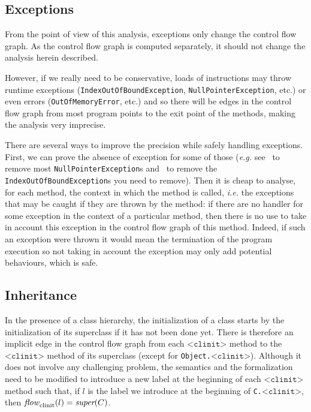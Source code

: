 \documentclass{entcs}
\newcommand{\clinit}{\ensuremath{\texttt{<clinit>}}}
\newcommand{\flow}{\mathit{flow}}
\newcommand{\clinitflow}{\flow_{\rm clinit}}
\begin{document}
\subsection{Exceptions}
\label{sec:exceptions}


From the point of view of this analysis, exceptions only change the
control flow graph.  As the control flow graph is computed separately,
it should not change the analysis herein described.

However, if we really need to be conservative, loads of instructions
may throw runtime exceptions (\texttt{IndexOutOfBoundException},
\texttt{NullPointerException}, etc.) or even errors
(\texttt{OutOfMemoryError}, etc.) and so there will be edges in the
control flow graph from most program points to the exit point of the
methods, making the analysis very imprecise.

There are several ways to improve the precision while safely handling
exceptions.  First, we can prove the absence of exception for some of
those (\emph{e.g.} see~\cite{hubert08-2:nonnull_annotation_inferencer}
to remove most \texttt{NullPointerException}s and~\cite{bodik00abcd}
to remove the \texttt{IndexOutOfBoundException}s you need to remove).
Then it is cheap to analyse, for each method, the context in which the
method is called, \emph{i.e.} the exceptions that may be caught if
they are thrown by the method: if there are no handler for some
exception in the context of a particular method, then there is no use
to take in account this exception in the control flow graph of this
method.  Indeed, if such an exception were thrown it would mean the
termination of the program execution so not taking in account the
exception may only add potential behaviours, which is safe.

\subsection{Inheritance}
\label{sec:class-hierarchy}
In the presence of a class hierarchy, the initialization of a class
starts by the initialization of its superclass if it has not been done
yet.  There is therefore an implicit edge in the control flow graph
from each \clinit{} method to the \clinit{} method of its superclass
(except for \texttt{Object.\clinit}).
Although it does not involve any challenging problem, the semantics
and the formalization need to be modified to introduce a new label at
the beginning of each \clinit{} method such that, if $l$ is the label
we introduce at the beginning of \texttt{C.\clinit}, then
$\clinitflow(l)=\textit{super}(C)$.
\end{document}
